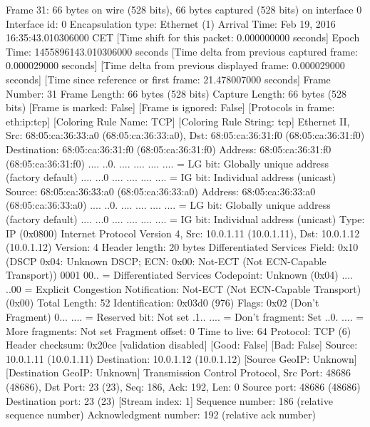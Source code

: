 Frame 31: 66 bytes on wire (528 bits), 66 bytes captured (528 bits) on interface 0
    Interface id: 0
    Encapsulation type: Ethernet (1)
    Arrival Time: Feb 19, 2016 16:35:43.010306000 CET
    [Time shift for this packet: 0.000000000 seconds]
    Epoch Time: 1455896143.010306000 seconds
    [Time delta from previous captured frame: 0.000029000 seconds]
    [Time delta from previous displayed frame: 0.000029000 seconds]
    [Time since reference or first frame: 21.478007000 seconds]
    Frame Number: 31
    Frame Length: 66 bytes (528 bits)
    Capture Length: 66 bytes (528 bits)
    [Frame is marked: False]
    [Frame is ignored: False]
    [Protocols in frame: eth:ip:tcp]
    [Coloring Rule Name: TCP]
    [Coloring Rule String: tcp]
Ethernet II, Src: 68:05:ca:36:33:a0 (68:05:ca:36:33:a0), Dst: 68:05:ca:36:31:f0 (68:05:ca:36:31:f0)
    Destination: 68:05:ca:36:31:f0 (68:05:ca:36:31:f0)
        Address: 68:05:ca:36:31:f0 (68:05:ca:36:31:f0)
        .... ..0. .... .... .... .... = LG bit: Globally unique address (factory default)
        .... ...0 .... .... .... .... = IG bit: Individual address (unicast)
    Source: 68:05:ca:36:33:a0 (68:05:ca:36:33:a0)
        Address: 68:05:ca:36:33:a0 (68:05:ca:36:33:a0)
        .... ..0. .... .... .... .... = LG bit: Globally unique address (factory default)
        .... ...0 .... .... .... .... = IG bit: Individual address (unicast)
    Type: IP (0x0800)
Internet Protocol Version 4, Src: 10.0.1.11 (10.0.1.11), Dst: 10.0.1.12 (10.0.1.12)
    Version: 4
    Header length: 20 bytes
    Differentiated Services Field: 0x10 (DSCP 0x04: Unknown DSCP; ECN: 0x00: Not-ECT (Not ECN-Capable Transport))
        0001 00.. = Differentiated Services Codepoint: Unknown (0x04)
        .... ..00 = Explicit Congestion Notification: Not-ECT (Not ECN-Capable Transport) (0x00)
    Total Length: 52
    Identification: 0x03d0 (976)
    Flags: 0x02 (Don't Fragment)
        0... .... = Reserved bit: Not set
        .1.. .... = Don't fragment: Set
        ..0. .... = More fragments: Not set
    Fragment offset: 0
    Time to live: 64
    Protocol: TCP (6)
    Header checksum: 0x20ce [validation disabled]
        [Good: False]
        [Bad: False]
    Source: 10.0.1.11 (10.0.1.11)
    Destination: 10.0.1.12 (10.0.1.12)
    [Source GeoIP: Unknown]
    [Destination GeoIP: Unknown]
Transmission Control Protocol, Src Port: 48686 (48686), Dst Port: 23 (23), Seq: 186, Ack: 192, Len: 0
    Source port: 48686 (48686)
    Destination port: 23 (23)
    [Stream index: 1]
    Sequence number: 186    (relative sequence number)
    Acknowledgment number: 192    (relative ack number)
